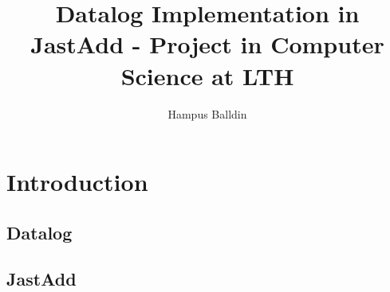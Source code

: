 \documentclass[a4paper]{article}
\title{Datalog Implementation in JastAdd - Project in Computer Science at LTH}
\author{Hampus Balldin
}
\theoremstyle{definition}
\begin{document}
\thispagestyle{empty}

\maketitle                    %
{}
\newpage
\tableofcontents
{}
\newpage
\section{Introduction}

\subsection{Datalog}
\subsection{JastAdd}

\newpage
{}

\end{document}
